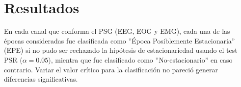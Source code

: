 \chapter{Resultados}

%


En cada canal que conforma el PSG (EEG, EOG y EMG), 
cada una de las \'epocas consideradas fue clasificada como 
''\'Epoca Posiblemente Estacionaria'' (EPE) si no pudo ser rechazado la hip\'otesis de 
estacionariedad usando el test PSR ($\alpha = 0.05$), mientra que 
fue clasificado como ''No-estacionario'' en caso contrario. Variar el valor cr\'itico
para la clasificaci\'on no pareci\'o generar diferencias significativas.


